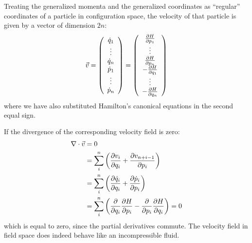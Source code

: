 Treating the generalized momenta and the generalized coordinates as ``regular'' coordinates of a particle in configuration space, the velocity of that particle is given by a vector of dimension $2n$:
\begin{align}
\vec v=\left(\begin{array}{c}
\dot q_1 \\ \vdots \\ \dot q_n \\ \dot p_1 \\ \vdots \\ \dot p_n \\
\end{array} \right) = \left(\begin{array}{c}
 \frac{\partial H}{\partial p_1} \\ \vdots \\ \frac{\partial H}{\partial p_n} \\ -\frac{\partial H}{\partial q_1} \\ \vdots \\ -\frac{\partial H}{\partial q_n} \\
\end{array} \right)
\end{align}
where we have also substituted Hamilton's canonical equations in the second equal sign.

If the divergence of the corresponding velocity field is zero:
\begin{align}
\nabla \cdot \vec v &=0\nonumber\\
&=\sum_i^n\left(\frac{\partial v_i}{\partial q_i}+\frac{\partial v_{n+i-1}}{\partial p_i}\right)\nonumber\\
&=\sum_i^n\left(\frac{\partial \dot q_i}{\partial q_i}+\frac{\partial \dot p_i}{\partial p_i}\right)\nonumber\\
&=\sum_i^n\left(\frac{\partial }{\partial q_i}\frac{\partial H}{\partial p_i}-\frac{\partial }{\partial p_i}\frac{\partial H}{\partial q_i}\right)=0
\end{align}
which is equal to zero, since the partial derivatives commute. The velocity field in field space does indeed behave like an incompressible fluid.

